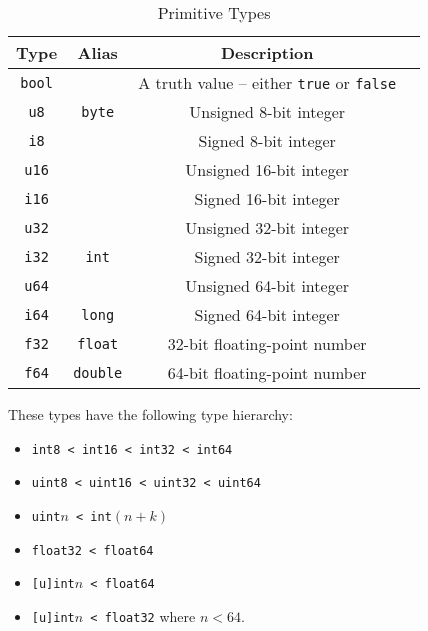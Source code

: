 \documentclass{article}
\begin{document}
    \medskip
    \begin{table}[H]
        \centering
        \begin{tabular}{|c|c|c|l|}
            \hline
            \textbf{Type} & \textbf{Alias} & \textbf{Description} \\
            \hline
            \texttt{bool} & & A truth value -- either \texttt{true} or \texttt{false} \\
            \hline
            \texttt{u8} & \texttt{byte} & Unsigned 8-bit integer \\
            \texttt{i8} & & Signed 8-bit integer \\
            \hline
            \texttt{u16} & & Unsigned 16-bit integer \\
            \texttt{i16} & & Signed 16-bit integer \\
            \hline
            \texttt{u32} & & Unsigned 32-bit integer \\
            \texttt{i32} & \texttt{int} & Signed 32-bit integer \\
            \hline
            \texttt{u64} & & Unsigned 64-bit integer \\
            \texttt{i64} & \texttt{long} & Signed 64-bit integer \\
            \hline
            \texttt{f32} & \texttt{float} & 32-bit floating-point number \\
            \texttt{f64} & \texttt{double} & 64-bit floating-point number \\
            \hline
        \end{tabular}
        \caption{Primitive Types}\label{tab:primitive-types}
    \end{table}


    These types have the following type hierarchy:
    \begin{itemize}
        \item \texttt{int8 < int16 < int32 < int64}
        \item \texttt{uint8 < uint16 < uint32 < uint64}
        \item \texttt{uint\(n\) < int\((n+k)\)}
        \item \texttt{float32 < float64}
        \item \texttt{[u]int\(n\) < float64}
        \item \texttt{[u]int\(n\) < float32} where \(n < 64\).
    \end{itemize}
\end{document}
